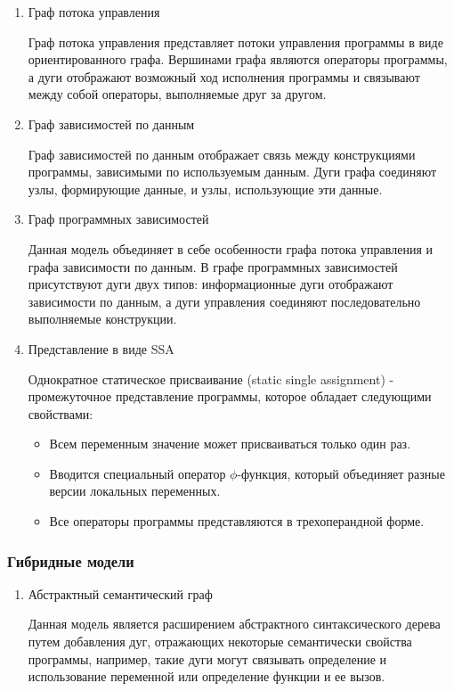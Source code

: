 \begin{enumerate}
    \item Граф потока управления

    Граф потока управления представляет потоки управления программы в виде
    ориентированного графа. Вершинами графа являются операторы программы, а дуги
    отображают возможный ход исполнения программы и связывают между собой
    операторы, выполняемые друг за другом.

    \item Граф зависимостей по данным

    Граф зависимостей по данным отображает связь между конструкциями программы,
    зависимыми по используемым данным. Дуги графа соединяют узлы, формирующие
    данные, и узлы, использующие эти данные.

    \item Граф программных зависимостей

    Данная модель объединяет в себе особенности графа потока управления и графа
    зависимости по данным. В графе программных зависимостей присутствуют дуги
    двух типов: информационные дуги отображают зависимости по данным, а
    дуги управления соединяют последовательно выполняемые конструкции.

    \item Представление в виде SSA

    Однократное статическое присваивание (static single assignment) -
    промежуточное представление программы, которое обладает следующими
    свойствами:
        \begin{itemize}
            \item Всем переменным значение может присваиваться только один раз.
            \item Вводится специальный оператор $\phi$-функция, который
            объединяет разные версии локальных переменных.
            \item Все операторы программы представляются в трехоперандной форме.
        \end{itemize}
\end{enumerate}

\subsubsection{Гибридные модели}
\begin{enumerate}
    \item Абстрактный семантический граф

    Данная модель является расширением абстрактного синтаксического дерева путем
    добавления дуг, отражающих некоторые семантически свойства программы,
    например, такие дуги могут связывать определение и использование переменной
    или определение функции и ее вызов.
\end{enumerate}

